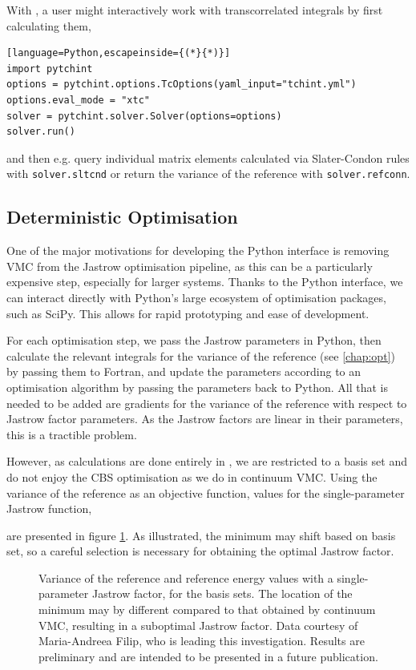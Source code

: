 With \pytchint, a user might interactively work with transcorrelated integrals by first calculating them,
\begin{lstlisting}[language=Python,escapeinside={(*}{*)}]
import pytchint
options = pytchint.options.TcOptions(yaml_input="tchint.yml")
options.eval_mode = "xtc"
solver = pytchint.solver.Solver(options=options)
solver.run()
\end{lstlisting}
and then e.g. query individual matrix elements calculated via Slater-Condon rules with \texttt{solver.sltcnd} or return the variance of the reference with \texttt{solver.refconn}.

\subsection{Deterministic Optimisation}

One of the major motivations for developing the Python interface is removing VMC from the Jastrow optimisation pipeline, as this can be a particularly expensive step, especially for larger systems. Thanks to the Python interface, we can interact directly with Python's large ecosystem of optimisation packages, such as SciPy.\supercite{2020SciPy-NMeth} This allows for rapid prototyping and ease of development.

For each optimisation step, we pass the Jastrow parameters in Python, then calculate the relevant integrals for the variance of the reference (see \autoref{chap:opt}) by passing them to Fortran, and update the parameters according to an optimisation algorithm by passing the parameters back to Python. All that is needed to be added are gradients for the variance of the reference with respect to Jastrow factor parameters. As the Jastrow factors are linear in their parameters, this is a tractible problem.

However, as calculations are done entirely in \pytchint, we are restricted to a basis set and do not enjoy the \gls{CBS} optimisation as we do in continuum \gls{VMC}. Using the variance of the reference as an objective function, values for the single-parameter Jastrow function,


are presented in figure \ref{fig:det-opt}. As illustrated, the minimum may shift based on basis set, so a careful selection is necessary for obtaining the optimal Jastrow factor.

\begin{figure}[htbp]
    \centering
    \caption{Variance of the reference and reference energy values with a single-parameter Jastrow factor, for the  basis sets. The location of the minimum may by different compared to that obtained by continuum VMC, resulting in a suboptimal Jastrow factor. Data courtesy of Maria-Andreea Filip, who is leading this investigation. Results are preliminary and are intended to be presented in a future publication.}
    \label{fig:det-opt}
\end{figure}

